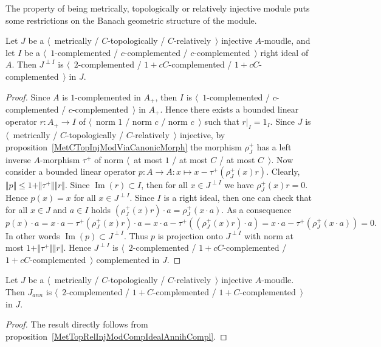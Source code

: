 The property of being metrically, topologically or relatively injective module 
puts some restrictions on the Banach geometric structure of the module.

\begin{proposition}\label{MetTopRelInjModCompIdealAnnihCompl} Let $J$ 
be a $\langle$~metrically / $C$-topologically / $C$-relatively~$\rangle$ 
injective $A$-moudle, and let $I$ 
be a $\langle$~$1$-complemented / $c$-complemented / $c$-complemented~$\rangle$
right ideal of $A$. Then $J^{\perp I}$ 
is $\langle$~$2$-complemented / $1+cC$-complemented / 
$1+cC$-complemented~$\rangle$ in $J$.
\end{proposition}
\begin{proof} Since $A$ is $1$-complemented in $A_+$, then $I$ 
is $\langle$~$1$-complemented / $c$-complemented / $c$-complemented~$\rangle$
in $A_+$. Hence there exists a bounded linear operator $r:A_+\to I$ of 
$\langle$~norm $1$ / norm $c$ / norm $c$~$\rangle$ such that $r|_I=1_I$. 
Since $J$ is $\langle$~metrically / $C$-topologically / $C$-relatively~$\rangle$ 
injective, by proposition~\ref{MetCTopInjModViaCanonicMorph} the 
morphism $\rho_J^+$ has a left inverse $A$-morphism $\tau^+$ of norm 
$\langle$~at most $1$ / at most $C$ / at most $C$~$\rangle$. Now consider 
a bounded linear operator $p:A\to A:x\mapsto x-\tau^+(\rho_J^+(x)r)$. Clearly,
$\Vert p\Vert\leq 1+\Vert \tau^+\Vert\Vert r\Vert$. 
Since $\operatorname{Im}(r)\subset I$, then for all $x\in J^{\perp I}$ we 
have $\rho_J^+(x)r=0$. Hence $p(x)=x$ for all $x\in J^{\perp I}$. Since $I$ is 
a right ideal, then one can check that for all $x\in J$ and $a\in I$ holds 
$(\rho_J^+(x)r)\cdot a=\rho_J^+(x\cdot a)$. As a consequence 
$$
p(x)\cdot a
=x\cdot a-\tau^+(\rho_J^+(x)r)\cdot a
=x\cdot a-\tau^+((\rho_J^+(x)r)\cdot a)
=x\cdot a-\tau^+(\rho_J^+(x\cdot a))
=0.
$$
In other words $\operatorname{Im}(p)\subset J^{\perp I}$. Thus $p$ is 
projection onto $J^{\perp I}$ with norm at 
most $1+\Vert \tau^+\Vert\Vert r\Vert$. Hence $J^{\perp I}$ 
is $\langle$~$2$-complemented / $1+cC$-complemented / 
$1+cC$-complemented~$\rangle$ complemented in $J$.
\end{proof}


\begin{corollary}\label{MetTopRelInjModAnnihCompl} Let $J$ 
be a $\langle$~metrically / $C$-topologically / $C$-relatively~$\rangle$ 
injective $A$-moudle. Then $J_{ann}$ 
is $\langle$~$2$-complemented / $1+C$-complemented / 
$1+C$-complemented~$\rangle$ in $J$.
\end{corollary}
\begin{proof} The result directly follows from 
proposition~\ref{MetTopRelInjModCompIdealAnnihCompl}.
\end{proof}

